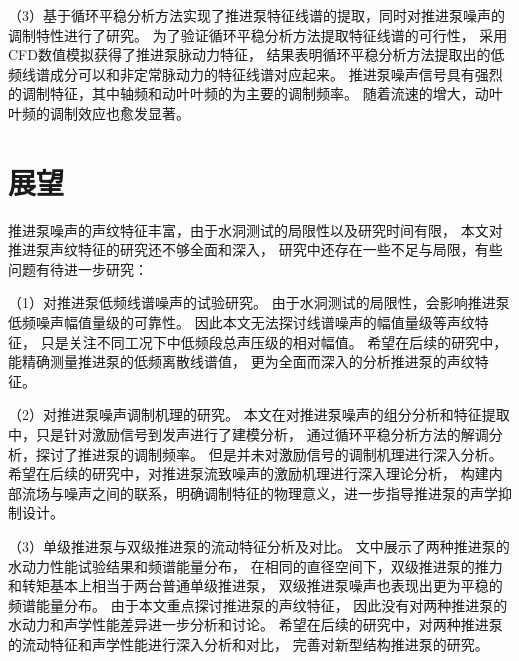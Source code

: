 （3）基于循环平稳分析方法实现了推进泵特征线谱的提取，同时对推进泵噪声的调制特性进行了研究。
为了验证循环平稳分析方法提取特征线谱的可行性，
采用CFD数值模拟获得了推进泵脉动力特征，
结果表明循环平稳分析方法提取出的低频线谱成分可以和非定常脉动力的特征线谱对应起来。
推进泵噪声信号具有强烈的调制特征，其中轴频和动叶叶频的为主要的调制频率。
随着流速的增大，动叶叶频的调制效应也愈发显著。

\section{展望}
推进泵噪声的声纹特征丰富，由于水洞测试的局限性以及研究时间有限，
本文对推进泵声纹特征的研究还不够全面和深入，
研究中还存在一些不足与局限，有些问题有待进一步研究：

（1）对推进泵低频线谱噪声的试验研究。
由于水洞测试的局限性，会影响推进泵低频噪声幅值量级的可靠性。
因此本文无法探讨线谱噪声的幅值量级等声纹特征，
只是关注不同工况下中低频段总声压级的相对幅值。
希望在后续的研究中，能精确测量推进泵的低频离散线谱值，
更为全面而深入的分析推进泵的声纹特征。

（2）对推进泵噪声调制机理的研究。
本文在对推进泵噪声的组分分析和特征提取中，只是针对激励信号到发声进行了建模分析，
通过循环平稳分析方法的解调分析，探讨了推进泵的调制频率。
但是并未对激励信号的调制机理进行深入分析。
希望在后续的研究中，对推进泵流致噪声的激励机理进行深入理论分析，
构建内部流场与噪声之间的联系，明确调制特征的物理意义，进一步指导推进泵的声学抑制设计。

（3）单级推进泵与双级推进泵的流动特征分析及对比。
文中展示了两种推进泵的水动力性能试验结果和频谱能量分布，
在相同的直径空间下，双级推进泵的推力和转矩基本上相当于两台普通单级推进泵，
双级推进泵噪声也表现出更为平稳的频谱能量分布。
由于本文重点探讨推进泵的声纹特征，
因此没有对两种推进泵的水动力和声学性能差异进一步分析和讨论。
希望在后续的研究中，对两种推进泵的流动特征和声学性能进行深入分析和对比，
完善对新型结构推进泵的研究。

